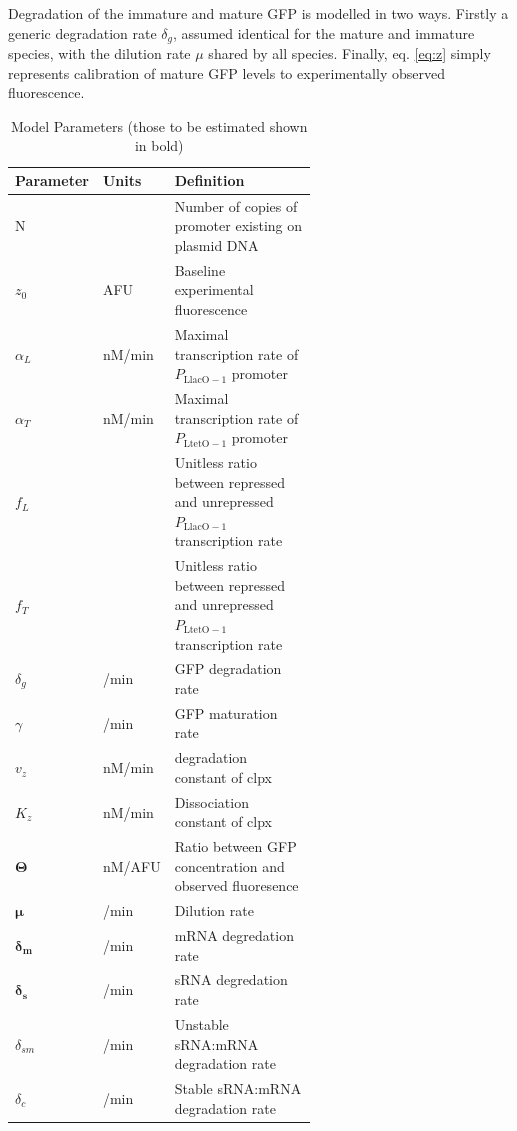\documentclass[10pt,journal]{./IEEE_latex_class/IEEEtran}
\begin{document}
Degradation of the immature and mature GFP is modelled in two ways. Firstly a generic degradation rate $\delta_{g}$, assumed identical for the mature and immature species, with the dilution rate $\mu$ shared by all species.
Finally, eq. \ref{eq:z} simply represents calibration of mature GFP levels to experimentally observed fluorescence.


\begin{table}[h]
\renewcommand{\arraystretch}{1.3}
\caption{Model Parameters (those to be estimated shown in bold)}
\label{ModelParameters}
\centering
\begin{tabular}{| l | l | p{0.6\linewidth} |}
\hline \textbf{Parameter} &  \textbf{Units} & \textbf{Definition}  \\
\hline \hline N & & Number of copies of promoter existing on plasmid DNA  \\
\hline $z_{0}$ &  AFU & Baseline experimental fluorescence  \\
\hline $\alpha_{L}$ & nM/min & Maximal transcription rate of $P_\mathrm{LlacO-1}$ promoter\\
\hline $\alpha_{T}$  &  nM/min  & Maximal transcription rate of $P_{\mathrm{LtetO-1}}$ promoter \\
\hline $f_{L}$ &  & Unitless ratio between repressed and unrepressed $P_\mathrm{LlacO-1}$ transcription rate   \\ 
\hline $f_{T}$ &  & Unitless ratio between repressed and unrepressed $P_{\mathrm{LtetO-1}}$ transcription rate  \\
\hline $\delta_{g}$  & /min  & GFP degradation rate  \\
\hline $\gamma$ &  /min & GFP maturation rate  \\
\hline $v_{z}$ & nM/min & degradation constant of clpx  \\
\hline $K_{z}$   &   nM/min & Dissociation constant of clpx  \\
\hline $\boldsymbol{\Theta}$  &   nM/AFU & Ratio between GFP concentration and observed fluoresence  \\
\hline $\boldsymbol{\mu}$ &  /min & Dilution rate  \\
\hline $\boldsymbol{\delta_{m}}$ &  /min & mRNA degredation rate  \\
\hline $\boldsymbol{\delta_{s}}$ &  /min & sRNA degredation rate  \\
\hline $\delta_{sm}$ &  /min & Unstable sRNA:mRNA degradation rate  \\
\hline $\delta_{c}$ &  /min & Stable sRNA:mRNA degradation rate  \\

\end{tabular}
\end{table}
\end{document}
